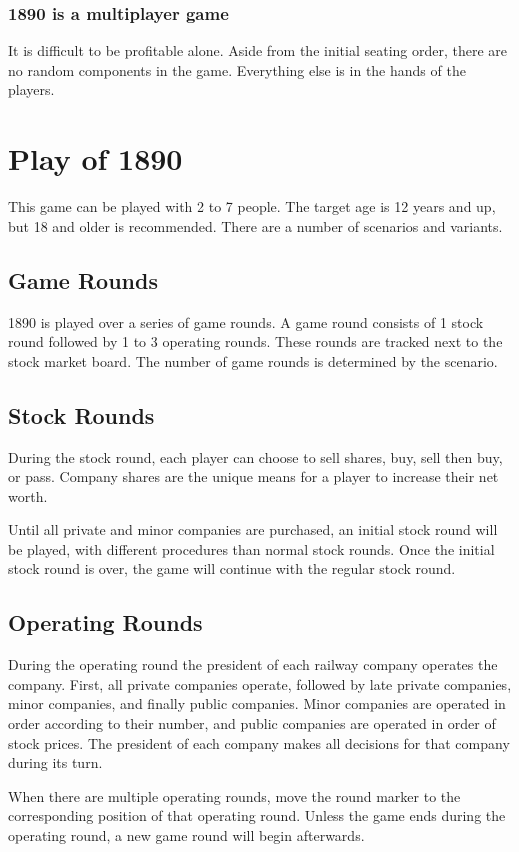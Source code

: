 \documentclass{article}
\begin{document}
\begin{CJK}{UTF8}{min}
\begin{multicols}{2}
\subsubsection*{1890 is a multiplayer game}
It is difficult to be profitable alone. Aside from the initial seating
order, there are no random components in the game. Everything else is
in the hands of the players.

\section{Play of 1890}
This game can be played with 2 to 7 people. The target age is 12 years
and up, but 18 and older is recommended. There are a number of
scenarios and variants.

\subsection{Game Rounds}
1890 is played over a series of game rounds. A game round consists of
1 stock round followed by 1 to 3 operating rounds. These rounds are
tracked next to the stock market board. The number of game rounds is
determined by the scenario.

\subsection{Stock Rounds}
During the stock round, each player can choose to sell
shares, buy, sell then buy, or pass. Company shares are the unique
means for a player to increase their net worth.

Until all private and minor companies are purchased, an initial stock
round will be played, with different procedures than normal stock
rounds. Once the initial stock round is over, the game will continue with
the regular stock round.

\subsection{Operating Rounds}
During the operating round the president of each railway company
operates the company. First, all private companies operate, followed
by late private companies, minor companies, and finally public
companies. Minor companies are operated in order according to their
number, and public companies are operated in order of stock
prices. The president of each company makes all decisions for that
company during its turn.

When there are multiple operating rounds, move the round marker to the
corresponding position of that operating round. Unless the game ends during
the operating round, a new game round will begin afterwards.


\end{multicols}
\end{CJK}
\end{document}
